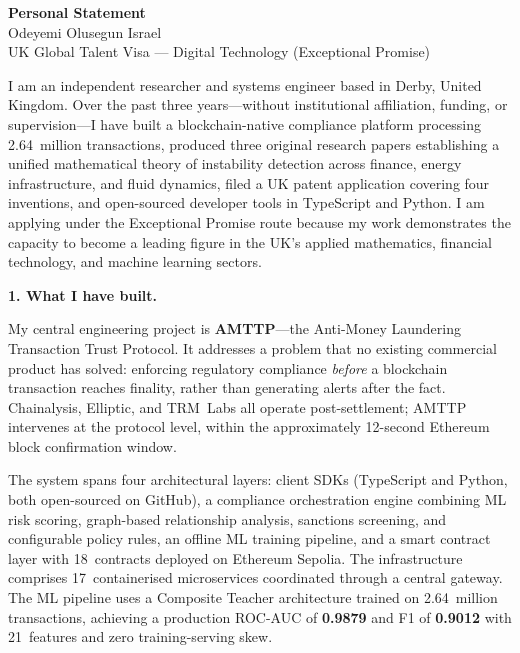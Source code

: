 \documentclass[12pt,a4paper]{article}
\begin{document}
\begin{center}
{\Large\bfseries Personal Statement}\\[4pt]
{\large Odeyemi Olusegun Israel}\\[2pt]
{\normalsize UK Global Talent Visa --- Digital Technology (Exceptional Promise)}
\end{center}

\bigskip

I am an independent researcher and systems engineer based in Derby,
United Kingdom.  Over the past three years---without institutional
affiliation, funding, or supervision---I have built a blockchain-native
compliance platform processing 2.64~million transactions, produced three
original research papers establishing a unified mathematical theory of
instability detection across finance, energy infrastructure, and fluid
dynamics, filed a UK patent application covering four inventions, and
open-sourced developer tools in TypeScript and Python.  I am applying
under the Exceptional Promise route because my work demonstrates the
capacity to become a leading figure in the UK's applied mathematics,
financial technology, and machine learning sectors.


\textbf{1. What I have built.}

My central engineering project is \textbf{AMTTP}---the Anti-Money
Laundering Transaction Trust Protocol.  It addresses a problem that no
existing commercial product has solved: enforcing regulatory compliance
\textit{before} a blockchain transaction reaches finality, rather than
generating alerts after the fact.  Chainalysis, Elliptic, and TRM~Labs
all operate post-settlement; AMTTP intervenes at the protocol level,
within the approximately 12-second Ethereum block confirmation window.

The system spans four architectural layers: client SDKs (TypeScript and
Python, both open-sourced on GitHub), a compliance orchestration engine
combining ML risk scoring, graph-based relationship analysis, sanctions
screening, and configurable policy rules, an offline ML training pipeline,
and a smart contract layer with 18~contracts deployed on Ethereum Sepolia.
The infrastructure comprises 17~containerised microservices coordinated
through a central gateway.  The ML pipeline uses a Composite Teacher
architecture trained on 2.64~million transactions, achieving a production
ROC-AUC of \textbf{0.9879} and F1 of \textbf{0.9012} with 21~features and
zero training-serving skew.
\end{document}
